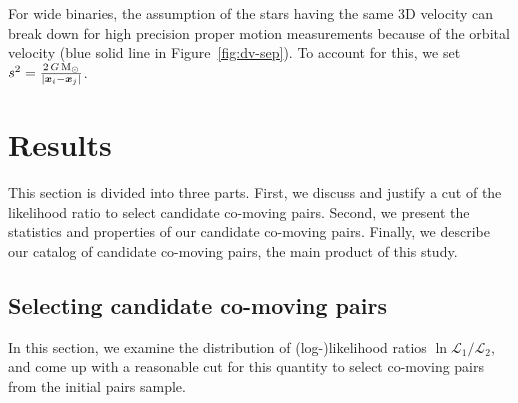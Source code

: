 \documentclass[manuscript, letterpaper]{aastex6}
\newcommand{\bs}[1]{\boldsymbol{#1}}
\renewcommand{\vec}[1]{\bs{#1}}
\newcommand{\msun}{{\rm M}_\odot}
\begin{document}
For wide binaries, the assumption of the stars having the same 3D velocity can
break down for high precision proper motion measurements because of the orbital
velocity (blue solid line in Figure~\ref{fig:dv-sep}).
To account for this, we set $s^2 = \frac{2 \, G \, \msun}{|\vec{x}_i-\vec{x}_j|}$.

\section{Results} \label{sec:results}

This section is divided into three parts. First, we discuss and justify a cut of
the likelihood ratio to select candidate co-moving pairs.
Second, we present the statistics and properties of our candidate co-moving
pairs.
Finally, we describe our catalog of candidate co-moving pairs, the main product
of this study.

\subsection{Selecting candidate co-moving pairs}
\label{sub:selection}

In this section, we examine the distribution of (log-)likelihood ratios
$\ln \mathcal{L}_1 /\mathcal{L}_2$, and come up with a reasonable cut
for this quantity to select co-moving pairs from the initial pairs sample.
\end{document}
